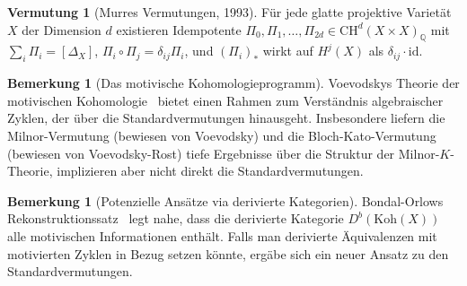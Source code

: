 \documentclass[12pt,a4paper]{amsart}
\theoremstyle{definition}
\newtheorem{vermutung}[theorem]{Vermutung}
\newtheorem{bemerkung}[theorem]{Bemerkung}
\newcommand{\Q}{\mathbb{Q}}
\newcommand{\id}{\mathrm{id}}
\newcommand{\CH}{\mathrm{CH}}
\begin{document}
\begin{vermutung}[Murres Vermutungen, 1993]
Für jede glatte projektive Varietät $X$ der Dimension $d$ existieren
Idempotente $\Pi_0, \Pi_1, \ldots, \Pi_{2d} \in \CH^d(X \times X)_\Q$
mit $\sum_i \Pi_i = [\Delta_X]$, $\Pi_i \circ \Pi_j = \delta_{ij} \Pi_i$,
und $(\Pi_i)_*$ wirkt auf $H^j(X)$ als $\delta_{ij}\cdot\id$.
\end{vermutung}

\begin{bemerkung}[Das motivische Kohomologieprogramm]
Voevodskys Theorie der motivischen Kohomologie~\cite{voevodsky2000} bietet
einen Rahmen zum Verständnis algebraischer Zyklen, der über die Standardvermutungen
hinausgeht.  Insbesondere liefern die Milnor-Vermutung (bewiesen von Voevodsky)
und die Bloch-Kato-Vermutung (bewiesen von Voevodsky-Rost) tiefe Ergebnisse
über die Struktur der Milnor-$K$-Theorie, implizieren aber nicht direkt die
Standardvermutungen.
\end{bemerkung}

\begin{bemerkung}[Potenzielle Ansätze via derivierte Kategorien]
Bondal-Orlows Rekonstruktionssatz~\cite{bondal2001} legt nahe, dass die
derivierte Kategorie $D^b(\mathrm{Koh}(X))$ alle motivischen Informationen
enthält.  Falls man derivierte Äquivalenzen mit motivierten Zyklen in Bezug
setzen könnte, ergäbe sich ein neuer Ansatz zu den Standardvermutungen.
\end{bemerkung}
\end{document}

